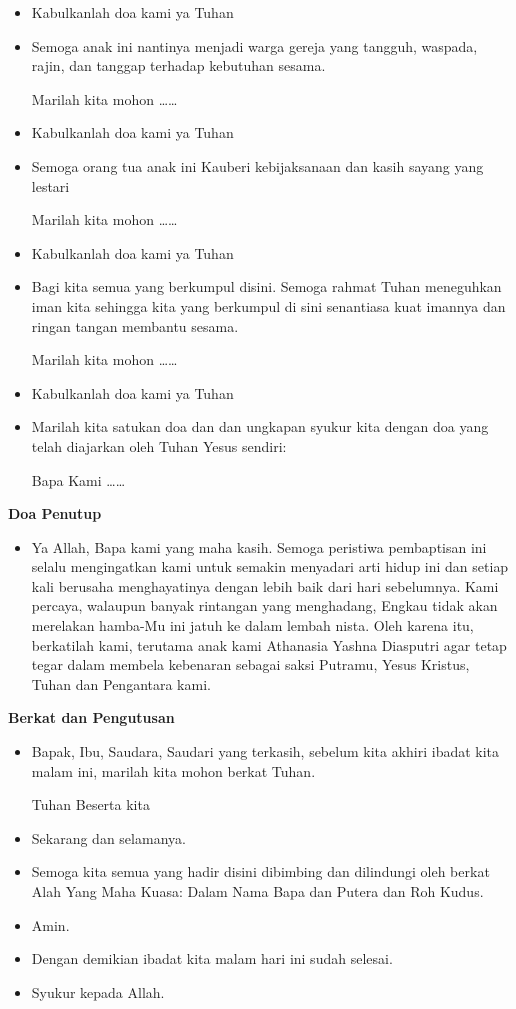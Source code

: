 \documentclass[titlepage,10pt,openany]{scrbook}
\makeatletter
\newcommand{\subjudul}[1]{%
  {\parindent \z@ 
    \interlinepenalty\@M \bfseries #1\par\nobreak \vskip 10\p@ }}
\newcommand{\BU}[1]{\begin{itemize} \item[U:] #1 \end{itemize}}
\newcommand{\BP}[1]{\begin{itemize} \item[P:] #1 \end{itemize}}
\newcommand{\namaanak}{Athanasia Yashna Diasputri}
\makeatother
\begin{document}
\BU{Kabulkanlah doa kami ya Tuhan}

\BP{Semoga anak ini nantinya menjadi warga gereja yang tangguh, waspada, rajin, dan tanggap terhadap kebutuhan sesama.

Marilah kita mohon \ldots\ldots
}

\BU{Kabulkanlah doa kami ya Tuhan}

\BP{Semoga orang tua anak ini Kauberi kebijaksanaan dan kasih sayang yang lestari

Marilah kita mohon \ldots\ldots
}

\BU{Kabulkanlah doa kami ya Tuhan}


\BP{Bagi kita semua yang berkumpul disini.
Semoga rahmat Tuhan meneguhkan iman kita sehingga kita yang berkumpul di sini senantiasa kuat imannya dan ringan tangan membantu sesama. 

Marilah kita mohon \ldots\ldots
}

\BU{Kabulkanlah doa kami ya Tuhan}


\BP{Marilah kita satukan doa dan dan ungkapan syukur kita dengan doa yang telah diajarkan oleh Tuhan Yesus sendiri: 

Bapa Kami \ldots\ldots
}


\subjudul{Doa Penutup}

\BP{Ya Allah, Bapa kami yang maha kasih. Semoga peristiwa pembaptisan ini selalu mengingatkan kami untuk semakin menyadari arti hidup ini dan setiap kali berusaha menghayatinya dengan lebih baik dari hari sebelumnya. Kami percaya, walaupun banyak rintangan yang menghadang, Engkau tidak akan merelakan hamba-Mu ini jatuh ke dalam lembah nista. Oleh karena itu, berkatilah kami, terutama anak kami \namaanak{} agar tetap tegar dalam membela kebenaran sebagai saksi Putramu, Yesus Kristus, Tuhan dan Pengantara kami.} 

\subjudul{Berkat dan Pengutusan}
\BP{Bapak, Ibu, Saudara, Saudari yang terkasih, sebelum kita akhiri ibadat kita malam ini, marilah kita mohon berkat Tuhan.

Tuhan Beserta kita
}

\BU{Sekarang dan selamanya.}

\BP{Semoga kita semua yang hadir disini dibimbing dan dilindungi oleh berkat Alah Yang Maha Kuasa: Dalam Nama Bapa dan Putera dan Roh Kudus.
}

\BU{Amin.}
 
\BP{Dengan demikian ibadat kita malam hari ini sudah selesai.}

\BU{Syukur kepada Allah.}
\end{document}
